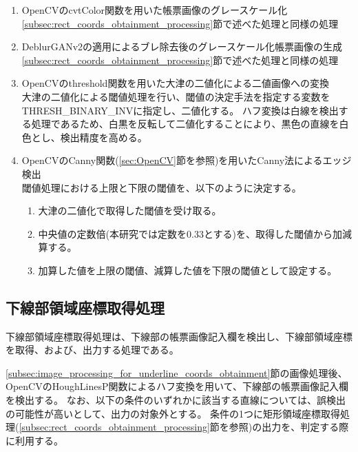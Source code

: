 \begin{enumerate}
    \item OpenCVのcvtColor関数を用いた帳票画像のグレースケール化\\
        \ref{subsec:rect_coords_obtainment_processing}節で述べた処理と同様の処理
    \item DeblurGANv2の適用によるブレ除去後のグレースケール化帳票画像の生成\\
        \ref{subsec:rect_coords_obtainment_processing}節で述べた処理と同様の処理
    \item OpenCVのthreshold関数を用いた大津の二値化による二値画像への変換\\
        大津の二値化による閾値処理を行い、閾値の決定手法を指定する変数をTHRESH\_BINARY\_INVに指定し、二値化する。
        ハフ変換は白線を検出する処理であるため、白黒を反転して二値化することにより、黒色の直線を白色とし、検出精度を高める。
    \item OpenCVのCanny関数(\ref{sec:OpenCV}節を参照)を用いたCanny法によるエッジ検出\\
        閾値処理における上限と下限の閾値を、以下のように決定する。
        \begin{enumerate}
            \item 大津の二値化で取得した閾値を受け取る。
            \item 中央値の定数倍(本研究では定数を0.33とする)を、取得した閾値から加減算する。
            \item 加算した値を上限の閾値、減算した値を下限の閾値として設定する。
        \end{enumerate}
\end{enumerate}


\subsection{下線部領域座標取得処理}\label{subsec:underline_coords_obtainment_processing}
下線部領域座標取得処理は、下線部の帳票画像記入欄を検出し、下線部領域座標を取得、および、出力する処理である。

\ref{subsec:image_processing_for_underline_coords_obtainment}節の画像処理後、OpenCVのHoughLinesP関数によるハフ変換を用いて、下線部の帳票画像記入欄を検出する。
なお、以下の条件のいずれかに該当する直線については、誤検出の可能性が高いとして、出力の対象外とする。
条件の1つに矩形領域座標取得処理(\ref{subsec:rect_coords_obtainment_processing}節を参照)の出力を、判定する際に利用する。

